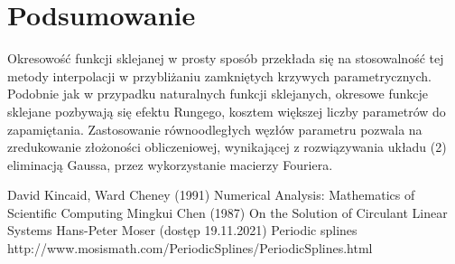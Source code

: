 \documentclass[11pt,wide]{article}
\begin{document}
\section{Podsumowanie}
Okresowość funkcji sklejanej w prosty sposób przekłada się na stosowalność tej metody interpolacji w przybliżaniu zamkniętych krzywych parametrycznych. Podobnie jak w przypadku naturalnych funkcji sklejanych, okresowe funkcje sklejane pozbywają się efektu Rungego, kosztem większej liczby parametrów do zapamiętania. Zastosowanie równoodległych węzłów parametru pozwala na zredukowanie złożoności obliczeniowej, wynikającej z rozwiązywania układu (2) eliminacją Gaussa, przez wykorzystanie macierzy Fouriera. 
\begin{thebibliography}{}

David Kincaid, Ward Cheney (1991) Numerical Analysis: Mathematics of Scientific Computing
Mingkui Chen (1987) On the Solution of Circulant Linear Systems
Hans-Peter Moser (dostęp 19.11.2021) Periodic splines\\ http://www.mosismath.com/PeriodicSplines/PeriodicSplines.html

\end{thebibliography}
\end{document}
